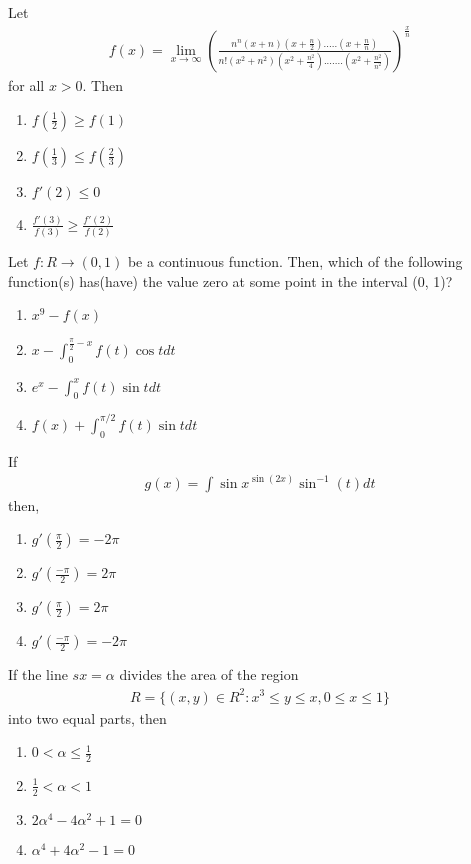 \item Let
\begin{align*}
f(x) = \lim_{x \to \infty}(\frac{n^n(x+n)(x+\frac{n}{2}).....(x+\frac{n}{n})}{n!(x^2+n^2)(x^2+\frac{n^2}{4}).......(x^2+\frac{n^2}{n^2})})^{\frac{x}{n}} 
\end{align*}
for all $x > 0$. Then
\begin{enumerate}
\item $f(\frac{1}{2}) \geq f(1)$
\item $f(\frac{1}{3}) \leq f(\frac{2}{3})$
\item $f'(2) \leq 0$
\item $\frac{f'(3)}{f(3)} \geq \frac{f'(2)}{f(2)}$
\end{enumerate}

\item Let $f: R \to (0, 1)$ be a continuous function. Then, which of the following function(s) has(have) the value zero at some point in the interval (0, 1)?
\begin{enumerate}
\item $x^9 - f(x)$
\item $x - \int_{0}^{\frac{\pi}{2} - x}f(t)\cos t dt$
\item $e^{x} - \int_{0}^{x}f(t)\sin t dt$
\item $f(x) + \int_{0}^{\pi/2}f(t)\sin t dt$
\end{enumerate}

\item If 
\begin{align*}
g(x) = \int{\sin x}^{\sin (2x)}\sin^{-1}(t)dt
\end{align*}
then,
\begin{enumerate}
\item $g'(\frac{\pi}{2}) = -2\pi$
\item $g'(\frac{-\pi}{2}) = 2\pi$
\item $g'(\frac{\pi}{2}) = 2\pi$
\item $g'(\frac{-\pi}{2}) = -2\pi$
\end{enumerate}

\item If the line $sx = \alpha$ divides the area of the region
\begin{align*}
R = \{(x, y) \in R^{2}: x^3 \leq y \leq x, 0 \leq x \leq 1\}
\end{align*}
into two equal parts, then
\begin{enumerate}
\item $0 < \alpha \leq \frac{1}{2}$
\item $\frac{1}{2} < \alpha < 1$
\item $2\alpha^{4} - 4\alpha^{2} + 1 = 0$
\item $\alpha^{4} + 4\alpha^{2} - 1 = 0$
\end{enumerate}

